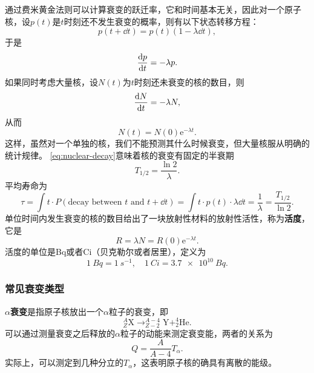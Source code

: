 \documentclass[UTF8, a4paper]{ctexart}
\newcommand*{\ee}{\mathrm{e}}
\newcommand*{\nuclear}[3]{^{#2}_{#3}\text{#1}}
\begin{document}
通过费米黄金法则可以计算衰变的跃迁率，它和时间基本无关，因此对一个原子核，设$p(t)$是$t$时刻还不发生衰变的概率，则有以下状态转移方程：
\[
    p(t+\dd{t}) = p(t) (1 - \lambda \dd{t}),
\]
于是
\[
    \dv{p}{t} = - \lambda p.
\]
如果同时考虑大量核，设$N(t)$为$t$时刻还未衰变的核的数目，则
\[
    \dv{N}{t} = - \lambda N,
\]
从而
\begin{equation}
    N(t) = N(0) \ee^{- \lambda t}.
    \label{eq:nuclear-decay}
\end{equation}
这样，虽然对一个单独的核，我们不能预测其什么时候衰变，但大量核服从明确的统计规律。
\eqref{eq:nuclear-decay}意味着核的衰变有固定的半衰期
\begin{equation}
    T_{1/2} = \frac{\ln 2}{\lambda}.    
\end{equation}
平均寿命为
\begin{equation}
    \tau = \int t \cdot P(\text{decay between $t$ and $t+\dd{t}$}) = \int t \cdot p(t) \cdot \lambda \dd{t} = \frac{1}{\lambda} = \frac{T_{1/2}}{\ln 2}.
\end{equation}
单位时间内发生衰变的核的数目给出了一块放射性材料的放射性活性，称为\textbf{活度}，它是
\begin{equation}
    R = \lambda N = R(0) \ee^{-\lambda t}.
\end{equation}
活度的单位是\si{Bq}或者\si{Ci}（贝克勒尔或者居里），定义为
\[
    \SI{1}{Bq} = \SI{1}{s^{-1}}, \quad \SI{1}{Ci} = \SI{3.7e10}{Bq}.
\]

\subsubsection{常见衰变类型}

\textbf{$\alpha$衰变}是指原子核放出一个$\alpha$粒子的衰变，即
\[
    \nuclear{X}{A}{Z} \longrightarrow \nuclear{Y}{A-4}{Z-2} + \nuclear{He}{4}{2}.
\]
可以通过测量衰变之后释放的$\alpha$粒子的动能来测定衰变能，两者的关系为
\begin{equation}
    Q = \frac{A}{A-4} T_\alpha.
\end{equation}
实际上，可以测定到几种分立的$T_\alpha$，这表明原子核的确具有离散的能级。
\end{document}
